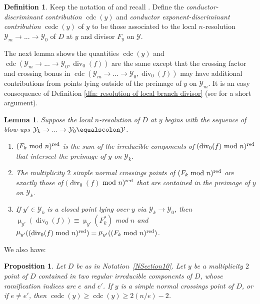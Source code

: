 \documentclass[12pt]{amsart}
\numberwithin{equation}{section}
\newtheorem{prop}[equation]{Proposition}
\newtheorem{lemma}[equation]{Lemma}
\theoremstyle{definition}
\newtheorem{defn}[equation]{Definition}
\newcommand{\padma}[1]{{\color{Magenta} \sf $\clubsuit\clubsuit\clubsuit$ Padma: [#1]}}
\newcommand{\Y}{\mathcal{Y}}
\newcommand{\tx}[1]{\text{#1}}
\DeclareMathOperator{\divi}{div}
\DeclareMathOperator{\red}{red}
\DeclareMathOperator{\cdc}{cdc}
\DeclareMathOperator{\cedc}{cedc}
\DeclareMathOperator{\mult}{\mu}
\begin{document}
\begin{defn}\label{dfn: cdc of a point}
    Keep the notation of  and recall . Define the %
    \textit{conductor-discriminant contribution} $\cdc(y)$ and
    \textit{conductor exponent-discriminant contribution} $\cedc(y)$ of $y$ to be those associated to the local $n$-resolution $\Y_m\to...\to\Y_0$ of $D$ at $y$ and divisor $F_y$ on $\Y$. 
\end{defn}

The next lemma shows the quantities $\cdc(y)$ and $\cdc(\Y_m\to...\to\Y_0,\divi_0(f))$ are the same except that the crossing factor and crossing bonus in $\cdc(\Y_m\to...\to\Y_0,\divi_0(f))$ may have additional contributions  from points lying outside of the preimage of $y$ on $\Y_m$. It is an easy consequence of Definition \ref{dfn: resolution of local branch divisor} (see \cite[Lemma 2.17]{Part2} for a short argument).

\begin{lemma}\label{lemma: compatible resolutions} \cite[Lemma 2.17]{Part2}
    Suppose the local $n$-resolution of $D$ at $y$ begins with the sequence of blow-ups $\Y_k\to...\to\Y_0\equalscolon\Y$.
    \begin{enumerate}[\upshape (i)]
        \item $(F_k\textup{ mod }n)^{\red}$ is the sum of the irreducible components of $(\divi_0(f)\textup{ mod }n)^{\red}$ that intersect the preimage of $y$ on $\Y_k$.
        \item The multiplicity $2$ simple normal crossings points of $(F_k\textup{ mod }n)^{\red}$ are exactly those of $(\divi_0(f)$ $\textup{mod }n)^{\red}$ that are contained in the preimage of $y$ on $\Y_k$.
        \item If $y'\in\Y_k$ is a closed point lying over $y$ via $\Y_k\to\Y_0$, then $\mult_{y'}(\divi_0(f))\equiv \mult_{y'}(F_k^*)$ \textup{mod} $n$ and $\mult_{y'}((\divi_0(f)\textup{ mod }n)^{\red})=\mult_{y'}((F_k\textup{ mod }n)^{\red})$.
    \end{enumerate}
\end{lemma}

We also have:

\begin{prop}\label{prop: error term cancellation}\cite[Proposition 4.7]{Part2} 
    Let $D$ be as in Notation~\ref{NSection10}. Let $y$ be a multiplicity $2$ point of $D$ contained in two regular irreducible components of $D$, whose ramification indices are $e$ and $e'$. If $y$ is a simple normal crossings point of $D$, or if $e\neq e'$, then $\cedc(y)\geq \cdc(y)\geq 2(n/e)-2$.
\end{prop}
\end{document}
